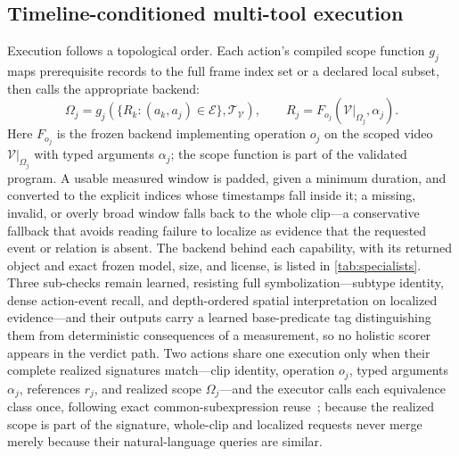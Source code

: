 \subsection{Timeline-conditioned multi-tool execution}
\label{sec:chaining}
Execution follows a topological order. Each action's compiled scope function $g_j$ maps prerequisite records to the full frame index set or a declared local subset, then calls the appropriate backend:
\begin{equation}
\Omega_j
  =g_j\!\left(\{R_k:(a_k,a_j)\in\mathcal{E}\},
              \mathcal{T}_{\mathcal V}\right),
\qquad
R_j
  =F_{o_j}\!\left(\mathcal{V}|_{\Omega_j},\alpha_j\right).
\label{eq:scoped-execution}
\end{equation}
Here $F_{o_j}$ is the frozen backend implementing operation $o_j$ on the scoped
video $\mathcal{V}|_{\Omega_j}$ with typed arguments $\alpha_j$; the scope function is
part of the validated program. A usable measured window is padded, given a minimum
duration, and converted to the explicit indices whose timestamps fall inside it; a
missing, invalid, or overly broad window falls back to the whole clip---a conservative
fallback that avoids reading failure to localize as evidence that the requested event or
relation is absent. The backend behind each capability, with its returned object and
exact frozen model, size, and license, is listed in \cref{tab:specialists}. Three
sub-checks remain learned, resisting full symbolization---subtype identity, dense
action-event recall, and depth-ordered spatial interpretation on localized
evidence---and their outputs carry a learned base-predicate tag distinguishing them from
deterministic consequences of a measurement, so no holistic scorer appears in the verdict
path. Two actions share one execution only when their complete realized signatures
match---clip identity, operation $o_j$, typed arguments $\alpha_j$, references $r_j$, and
realized scope $\Omega_j$---and the executor calls each equivalence class once, following
exact common-subexpression reuse~\cite{sellis1988mqo,roy2000mqo}; because the realized
scope is part of the signature, whole-clip and localized requests never merge merely
because their natural-language queries are similar.

